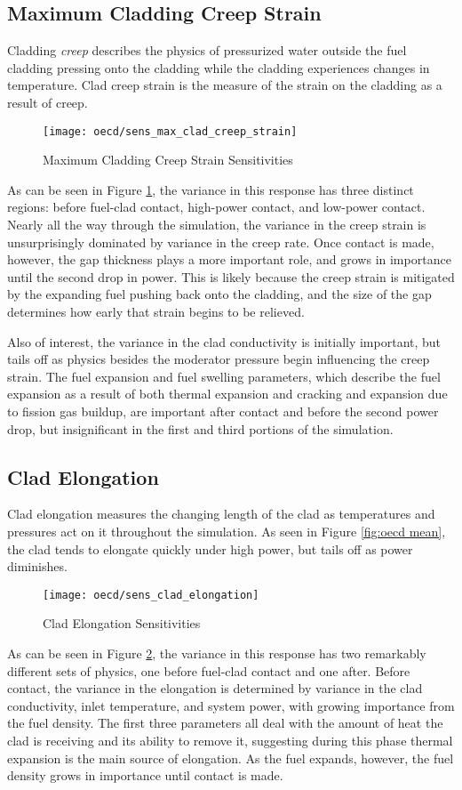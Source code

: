 \subsection{Maximum Cladding Creep Strain}
Cladding \emph{creep} describes the physics of pressurized water outside the fuel cladding pressing onto the
cladding while the cladding experiences changes in temperature.  Clad creep strain is the measure of the
strain on the cladding as a result of creep.
\begin{figure}[H]
  \centering
  \texttt{[image: oecd/sens\_max\_clad\_creep\_strain]}
  \caption{Maximum Cladding Creep Strain Sensitivities}
  \label{fig:oecd strain}
\end{figure}
As can be seen in Figure \ref{fig:oecd strain}, the variance in this response has three distinct regions: before
fuel-clad contact, high-power contact, and low-power contact.  Nearly all the way through the simulation, the
variance in the creep strain is unsurprisingly dominated by variance in the creep rate.  Once contact is made,
however, the gap thickness plays a more important role, and grows in importance until the second drop in
power.  This is likely because the creep strain is mitigated by the expanding fuel pushing back onto the
cladding, and the size of the gap determines how early that strain begins to be relieved.

Also of interest, the variance in the clad conductivity is initially important, but tails off as physics
besides the moderator pressure begin influencing the creep strain.  The fuel expansion and fuel swelling
parameters, which describe the fuel expansion as a result of both thermal expansion and cracking and expansion
due to fission gas buildup, are important after contact and before the second power drop, but insignificant
in the first and third portions of the simulation.


\subsection{Clad Elongation}
Clad elongation measures the changing length of the clad as temperatures and pressures act on it throughout
the simulation.  As seen in Figure \ref{fig:oecd mean}, the clad tends to elongate quickly under high power,
but tails off as power diminishes.
\begin{figure}[H]
  \centering
  \texttt{[image: oecd/sens\_clad\_elongation]}
  \caption{Clad Elongation Sensitivities}
  \label{fig:oecd elong}
\end{figure}
As can be seen in Figure \ref{fig:oecd elong}, the variance in this response has two remarkably different
sets of physics, one before fuel-clad contact and one after.  Before contact, the variance in the elongation
is determined by variance in the clad conductivity, inlet temperature, and system power, with growing
importance from the fuel density.  The first three parameters all deal with the amount of heat the clad is
receiving and its ability to remove it, suggesting during this phase thermal expansion is the main source of
elongation.  As the fuel expands, however, the fuel density grows in importance until contact is made.


